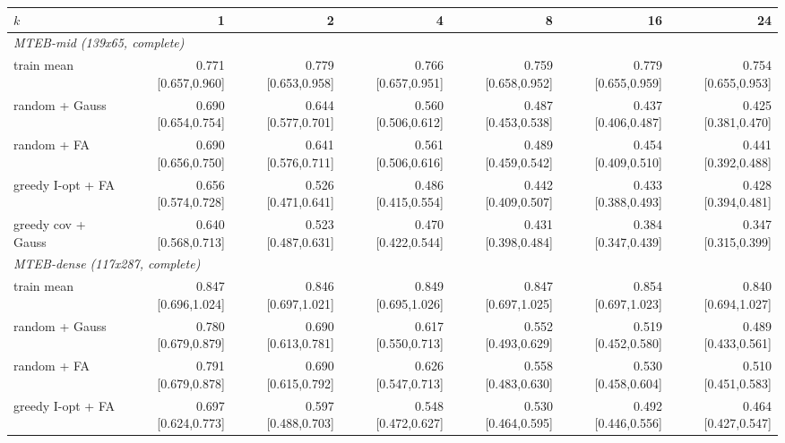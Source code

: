\begin{tabular}{lrrrrrr}\toprule
$k$ & 1 & 2 & 4 & 8 & 16 & 24 \\\midrule
\multicolumn{7}{l}{\textit{MTEB-mid (139x65, complete)}} \\
train mean & 0.771 \scriptsize[0.657,0.960] & 0.779 \scriptsize[0.653,0.958] & 0.766 \scriptsize[0.657,0.951] & 0.759 \scriptsize[0.658,0.952] & 0.779 \scriptsize[0.655,0.959] & 0.754 \scriptsize[0.655,0.953] \\
random + Gauss & 0.690 \scriptsize[0.654,0.754] & 0.644 \scriptsize[0.577,0.701] & 0.560 \scriptsize[0.506,0.612] & 0.487 \scriptsize[0.453,0.538] & 0.437 \scriptsize[0.406,0.487] & 0.425 \scriptsize[0.381,0.470] \\
random + FA & 0.690 \scriptsize[0.656,0.750] & 0.641 \scriptsize[0.576,0.711] & 0.561 \scriptsize[0.506,0.616] & 0.489 \scriptsize[0.459,0.542] & 0.454 \scriptsize[0.409,0.510] & 0.441 \scriptsize[0.392,0.488] \\
greedy I-opt + FA & 0.656 \scriptsize[0.574,0.728] & 0.526 \scriptsize[0.471,0.641] & 0.486 \scriptsize[0.415,0.554] & 0.442 \scriptsize[0.409,0.507] & 0.433 \scriptsize[0.388,0.493] & 0.428 \scriptsize[0.394,0.481] \\
greedy cov + Gauss & 0.640 \scriptsize[0.568,0.713] & 0.523 \scriptsize[0.487,0.631] & 0.470 \scriptsize[0.422,0.544] & 0.431 \scriptsize[0.398,0.484] & 0.384 \scriptsize[0.347,0.439] & 0.347 \scriptsize[0.315,0.399] \\
\multicolumn{7}{l}{\textit{MTEB-dense (117x287, complete)}} \\
train mean & 0.847 \scriptsize[0.696,1.024] & 0.846 \scriptsize[0.697,1.021] & 0.849 \scriptsize[0.695,1.026] & 0.847 \scriptsize[0.697,1.025] & 0.854 \scriptsize[0.697,1.023] & 0.840 \scriptsize[0.694,1.027] \\
random + Gauss & 0.780 \scriptsize[0.679,0.879] & 0.690 \scriptsize[0.613,0.781] & 0.617 \scriptsize[0.550,0.713] & 0.552 \scriptsize[0.493,0.629] & 0.519 \scriptsize[0.452,0.580] & 0.489 \scriptsize[0.433,0.561] \\
random + FA & 0.791 \scriptsize[0.679,0.878] & 0.690 \scriptsize[0.615,0.792] & 0.626 \scriptsize[0.547,0.713] & 0.558 \scriptsize[0.483,0.630] & 0.530 \scriptsize[0.458,0.604] & 0.510 \scriptsize[0.451,0.583] \\
greedy I-opt + FA & 0.697 \scriptsize[0.624,0.773] & 0.597 \scriptsize[0.488,0.703] & 0.548 \scriptsize[0.472,0.627] & 0.530 \scriptsize[0.464,0.595] & 0.492 \scriptsize[0.446,0.556] & 0.464 \scriptsize[0.427,0.547] \\

\end{tabular}

